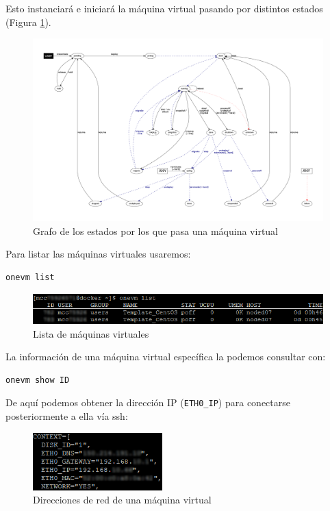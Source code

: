 Esto instanciará e iniciará la máquina virtual pasando por distintos estados (Figura \ref{fig:grafo-estados}).

\begin{figure}[H]
	\centering
	\includegraphics[width=14.5cm]{img/grafo-estados}
	\caption{Grafo de los estados por los que pasa una máquina virtual}
	\label{fig:grafo-estados}
\end{figure}

Para listar las máquinas virtuales usaremos:

\begin{lstlisting}
onevm list
\end{lstlisting}

\begin{figure}[H]
	\centering
	\includegraphics[width=14cm]{img/onevm-list}
	\caption{Lista de máquinas virtuales}
	\label{fig:onevm-list}
\end{figure}

La información de una máquina virtual específica la podemos consultar con:

\begin{lstlisting}
onevm show ID
\end{lstlisting}

De aquí podemos obtener la dirección IP (\texttt{ETH0\_IP}) para conectarse posteriormente a ella vía ssh:

\begin{figure}[H]
	\centering
	\includegraphics[width=5cm]{img/onevm-show-context}
	\caption{Direcciones de red de una máquina virtual}
	\label{fig:onevm-show-context}
\end{figure}

